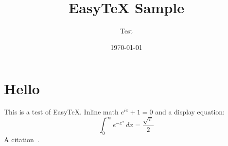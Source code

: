 \documentclass[11pt]{article}
\title{EasyTeX Sample}
\author{Test}
\date{\today}
\begin{document}
\maketitle

\section{Hello}
This is a test of EasyTeX. Inline math $e^{i\pi}+1=0$ and a display equation:
\begin{equation}
  \int_0^\infty e^{-x^2}\,dx = \frac{\sqrt{\pi}}{2}
\end{equation}
A citation~\cite{knuth84}.





\end{document}
